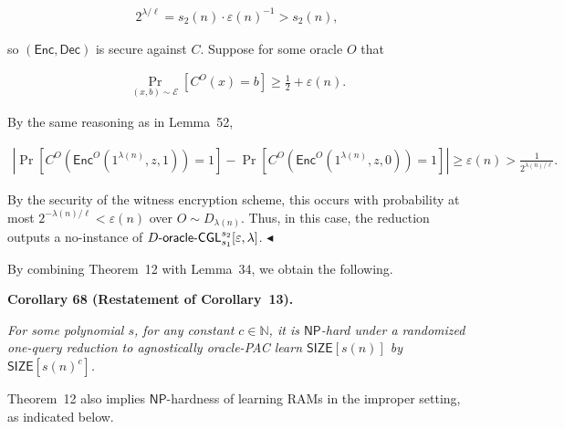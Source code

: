 \documentclass[10pt,a4paper]{article}
\begin{document}
\[\begin{gathered}
2^{\lambda/\ell}=s_{2}(n)\cdot\varepsilon(n)^{-1}>s_{2}(n),
\end{gathered}\]


so $({\mathsf{Enc}},{\mathsf{Dec}})$ is secure against $C$. Suppose for some oracle $O$ that\par


\[\begin{gathered}
\Pr_{(x,b)\sim\mathcal{E}}[C^{O}(x)=b]\geq\frac{1}{2}+\varepsilon(n).
\end{gathered}\]


By the same reasoning as in Lemma 52,\par


\[\begin{gathered}
\left|\Pr[C^{O}({\mathsf{Enc}}^{O}(1^{\lambda(n)},z,1))=1]-\Pr[C^{O}({\mathsf{Enc}}^{O}(1^{\lambda(n)},z,0))=1]\right|\geq\varepsilon(n)>\frac{1}{2^{\lambda(n)/\ell}}.
\end{gathered}\]


By the security of the witness encryption scheme, this occurs with probability at most $2^{-\lambda(n)/\ell}<\varepsilon(n)$ over $O\sim D_{\lambda(n)}$. Thus, in this case, the reduction outputs a no-instance of $D\text{-}{\sf oracle}\text{-}{\sf CGL}^{s_{2}}_{s_{1}}[\varepsilon,\lambda]$.
$\blacktriangleleft$\par




By combining Theorem 12 with Lemma 34, we obtain the following.\par





\par\medskip\noindent\textbf{
\textbf{Corollary 68}\textbf{ }(Restatement of Corollary 13)\textbf{.}
}\par



\emph{For some polynomial $s$, for any constant $c\in\mathbb{N}$, it is ${\mathsf{NP}}$-hard under a randomized one-query reduction to agnostically oracle-PAC learn ${\mathsf{SIZE}}[s(n)]$ by ${\mathsf{SIZE}}[s(n)^{c}]$.}\par






Theorem 12 also implies ${\mathsf{NP}}$-hardness of learning RAMs in the improper setting, as indicated below.\par
\end{document}
